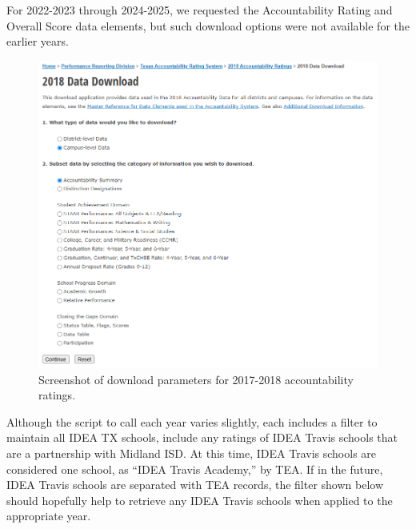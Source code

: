 \documentclass[
  letterpaper,
  DIV=11,
  numbers=noendperiod]{scrreprt}
\begin{document}
For 2022-2023 through 2024-2025, we requested the Accountability Rating
and Overall Score data elements, but such download options were not
available for the earlier years.

\begin{figure}[H]

{\centering \includegraphics[width=6.25in,height=\textheight,keepaspectratio]{visuals/2018_accountability_screenshot.png}

}

\caption{Screenshot of download parameters for 2017-2018 accountability
ratings.}

\end{figure}%

Although the script to call each year varies slightly, each includes a
filter to maintain all IDEA TX schools, include any ratings of IDEA
Travis schools that are a partnership with Midland ISD. At this time,
IDEA Travis schools are considered one school, as ``IDEA Travis
Academy,'' by TEA. If in the future, IDEA Travis schools are separated
with TEA records, the filter shown below should hopefully help to
retrieve any IDEA Travis schools when applied to the appropriate year.
\end{document}
